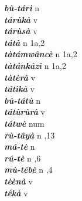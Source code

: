 \begin{multicols}{2}
{{\bfseries\itshape bù-tárì}} \relax  n   \relax  {} \relax   \relax  \\
{{\bfseries\itshape tárùkà}} \relax  v  \relax   \relax  {} \relax   \relax  \\
{{\bfseries\itshape tárùsà}} \relax  v  \relax   \relax  {} \relax   \relax  \\
{{\bfseries\itshape tátà}} \relax  n  \relax  1a,2  \relax   \relax  \\
{{\bfseries\itshape tàtámwâncè}} \relax  n  \relax  1a,2  \relax   \relax  \\
{{\bfseries\itshape tàtánkâzì}} \relax  n  \relax  1a,2  \relax   \relax  \\
{{\bfseries\itshape tàtèrà}} \relax  v  \relax   \relax  {} \relax   \relax  \\
{{\bfseries\itshape tátìkà}} \relax  v  \relax   \relax  {} \relax   \relax  \\
{{\bfseries\itshape bù-tátù}} \relax  n   \relax  {} \relax   \relax  \\
{{\bfseries\itshape tátùrùrà}} \relax  v  \relax   \relax  {} \relax   \relax  \\
{{\bfseries\itshape tátwè}} \relax  num  \relax   \relax  {} \relax   \relax  \\
{{\bfseries\itshape rù-tâyà}} \relax  n  ,13  \relax   \relax  \\
{{\bfseries\itshape má-tè}} \relax  n   \relax  {} \relax   \relax  \\
{{\bfseries\itshape rú-tè}} \relax  n  ,6  \relax   \relax  \\
{{\bfseries\itshape mù-tébè}} \relax  n  ,4  \relax   \relax  \\
{{\bfseries\itshape tèènà}} \relax  v  \relax   \relax  {} \relax   \relax  \\
{{\bfseries\itshape têkà}} \relax  v  \relax   \relax  {} \relax   \relax  \\

\end{multicols}
